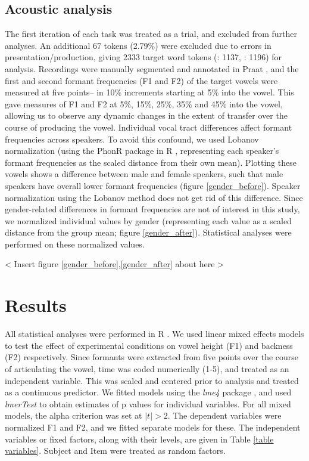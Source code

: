 \documentclass[12 pt]{article}
\newcommand{\nt}[1]{\textipa{[#1]}} %
\begin{document}
\subsection{Acoustic analysis}\label{analysis}
The first iteration of each task was treated as a trial, and excluded from further analyses. An additional 67 tokens (2.79\%) were excluded due to errors in presentation/production, giving 2333 target word tokens (\nt{2}: 1137, \nt{\ae}: 1196) for analysis. Recordings were manually segmented and annotated in Praat \citep{boersma2016praat}, and the first and second formant frequencies (F1 and F2) of the target vowels \nt{2, \ae} were measured at five points-- in 10\% increments starting at 5\% into the vowel. This gave measures of F1 and F2 at 5\%, 15\%, 25\%, 35\% and 45\% into the vowel, allowing us to observe any dynamic changes in the extent of transfer over the course of producing the vowel. Individual vocal tract differences affect formant frequencies across speakers. To avoid this confound, we used Lobanov normalization (using the PhonR package \citep{phonR} in R \citep{r}, representing each speaker's formant frequencies as the scaled distance from their own mean). Plotting these vowels shows a difference between male and female speakers, such that male speakers have overall lower formant frequencies (figure \ref{gender_before}). Speaker normalization using the Lobanov method does not get rid of this difference. Since gender-related differences in formant frequencies are not of interest in this study, we normalized individual values by gender (representing each value as a scaled distance from the group mean; figure \ref{gender_after}). Statistical analyses were performed on these normalized values. 

< Insert figure \ref{gender_before},\ref{gender_after} about here >

\section{Results} \label{results}

All statistical analyses were performed in R \citep{r}. We used linear mixed effects models to test the effect of experimental conditions on vowel height (F1) and backness (F2) respectively. Since formants were extracted from five points over the course of articulating the vowel, time was coded numerically (1-5), and treated as an independent variable. This was scaled and centered prior to analysis and treated as a continuous predictor. We fitted models using the \emph{lme4} package \citep{lme4}, and used \emph{lmerTest} \citep{lmerTest} to obtain estimates of p values for individual variables. For all mixed models, the alpha criterion was set at $|t| > 2 $. The dependent variables were normalized F1 and F2, and we fitted separate models for these. The independent variables or fixed factors, along with their levels, are given in Table \ref{table variables}. Subject and Item were treated as random factors.\\
\end{document}
